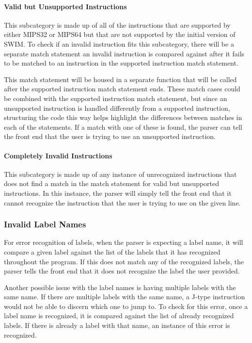 \documentclass[
    paper=letter,
    parskip=half,
    fontsize=12pt,
    titlepage=firstiscover,
    toc=bibliography,
    numbers=endperiod
]{scrartcl}
\begin{document}
\paragraph{Valid but Unsupported Instructions}

This subcategory is made up of all of the instructions that are
supported by either MIPS32 or MIPS64 but that are not supported by the
initial version of SWIM. To check if an invalid instruction fits this
subcategory, there will be a separate match statement an invalid
instruction is compared against after it fails to be matched to an
instruction in the supported instruction match statement.

This match statement will be housed in a separate function that will be
called after the supported instruction match statement ends. These match
cases could be combined with the supported instruction match statement,
but since an unsupported instruction is handled differently from a
supported instruction, structuring the code this way helps highlight the
differences between matches in each of the statements. If a match with
one of these is found, the parser can tell the front end that the user
is trying to use an unsupported instruction.

\paragraph{Completely Invalid Instructions}

This subcategory is made up of any instance of unrecognized instructions
that does not find a match in the match statement for valid but
unsupported instructions. In this instance, the parser will simply tell
the front end that it cannot recognize the instruction that the user is
trying to use on the given line.

\subsubsection{Invalid Label Names}
\label{subsec:invalid-label-names}

For error recognition of labels, when the parser is expecting a label
name, it will compare a given label against the list of the labels that
it has recognized throughout the program. If this does not match any of
the recognized labels, the parser tells the front end that it does not
recognize the label the user provided.

Another possible issue with the label names is having multiple labels
with the same name. If there are multiple labels with the same name, a
J-type instruction would not be able to discern which one to jump to. To
check for this error, once a label name is recognized, it is compared
against the list of already recognized labels. If there is already a
label with that name, an instance of this error is recognized.
\end{document}

